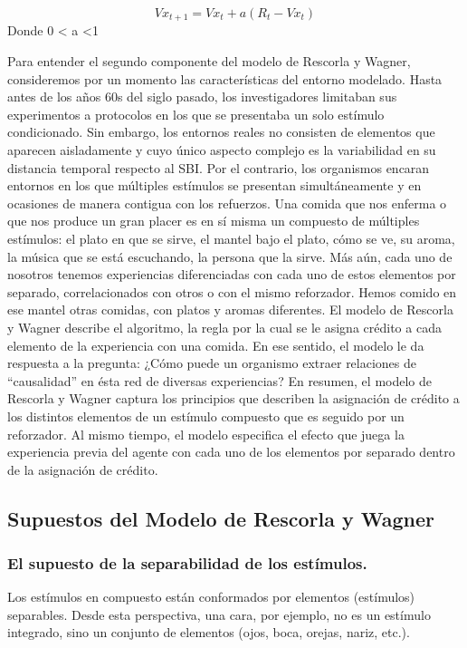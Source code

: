 \documentclass[
  a4paper,
  DIV=11,
  numbers=noendperiod]{scrreprt}
\begin{document}
\[Vx_{t+1}= Vx_t + a (R_t -Vx_t)\] Donde 0 \textless{} a \textless1

Para entender el segundo componente del modelo de Rescorla y Wagner,
consideremos por un momento las características del entorno modelado.
Hasta antes de los años 60s del siglo pasado, los investigadores
limitaban sus experimentos a protocolos en los que se presentaba un solo
estímulo condicionado. Sin embargo, los entornos reales no consisten de
elementos que aparecen aisladamente y cuyo único aspecto complejo es la
variabilidad en su distancia temporal respecto al SBI. Por el contrario,
los organismos encaran entornos en los que múltiples estímulos se
presentan simultáneamente y en ocasiones de manera contigua con los
refuerzos. Una comida que nos enferma o que nos produce un gran placer
es en sí misma un compuesto de múltiples estímulos: el plato en que se
sirve, el mantel bajo el plato, cómo se ve, su aroma, la música que se
está escuchando, la persona que la sirve. Más aún, cada uno de nosotros
tenemos experiencias diferenciadas con cada uno de estos elementos por
separado, correlacionados con otros o con el mismo reforzador. Hemos
comido en ese mantel otras comidas, con platos y aromas diferentes. El
modelo de Rescorla y Wagner describe el algoritmo, la regla por la cual
se le asigna crédito a cada elemento de la experiencia con una comida.
En ese sentido, el modelo le da respuesta a la pregunta: ¿Cómo puede un
organismo extraer relaciones de ``causalidad'' en ésta red de diversas
experiencias? En resumen, el modelo de Rescorla y Wagner captura los
principios que describen la asignación de crédito a los distintos
elementos de un estímulo compuesto que es seguido por un reforzador. Al
mismo tiempo, el modelo especifica el efecto que juega la experiencia
previa del agente con cada uno de los elementos por separado dentro de
la asignación de crédito.

\subsection{Supuestos del Modelo de Rescorla y
Wagner}\label{supuestos-del-modelo-de-rescorla-y-wagner}

\subsubsection{El supuesto de la separabilidad de los
estímulos.}\label{el-supuesto-de-la-separabilidad-de-los-estuxedmulos.}

Los estímulos en compuesto están conformados por elementos (estímulos)
separables. Desde esta perspectiva, una cara, por ejemplo, no es un
estímulo integrado, sino un conjunto de elementos (ojos, boca, orejas,
nariz, etc.).
\end{document}
